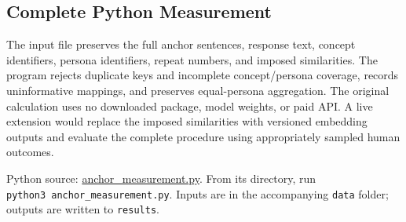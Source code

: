 \hypertarget{M05-complete-python-measurement}{%
\subsection{Complete Python
Measurement}\label{M05-complete-python-measurement}}

\noindent \noindent The input file preserves the full anchor sentences, response
text, concept identifiers, persona identifiers, repeat numbers, and
imposed similarities. The program rejects duplicate keys and incomplete
concept/persona coverage, records uninformative mappings, and preserves
equal-persona aggregation. The original calculation uses no downloaded
package, model weights, or paid API. A live extension would replace the
imposed similarities with versioned embedding outputs and evaluate the
complete procedure using appropriately sampled human outcomes.

\FloatBarrier
{}
Python source:
\href{../03_Data_and_Code/Synthetic_Consumers/anchor_measurement.py}{anchor\_measurement.py}.
From its directory, run \texttt{python3\ anchor\_measurement.py}. Inputs
are in the accompanying \texttt{data} folder; outputs are written to
\texttt{results}.

